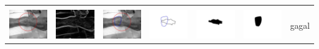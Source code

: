 \begin{table}[H]
\begin{tabular}{|m{0.7in}|m{0.7in}|m{0.7in}|m{0.7in}|m{0.7in}|m{0.7in}|m{0.7in}|}
		&  &  & & & &  \\
		\includegraphics[width=0.7in]{dataset/dataset_3/luka_merah/ready/6_interp_init.jpg}&
		\includegraphics[width=0.7in]{dataset/dataset_3/luka_merah/ready/6_interp_ext.jpg}&
		\includegraphics[width=0.7in]{dataset/dataset_3/luka_merah/ready/6_interp_result.jpg}&
		\includegraphics[width=0.7in]{dataset/dataset_3/luka_merah/ready/6_gt_r.jpg}&
		\includegraphics[width=0.7in]{dataset/dataset_3/luka_merah/ready/6_r.jpg}&
		\includegraphics[width=0.7in]{dataset/dataset_3/luka_merah/ready/6_interp_r.jpg}&
		gagal\\
		\hline
		

\end{tabular}
\end{table}
